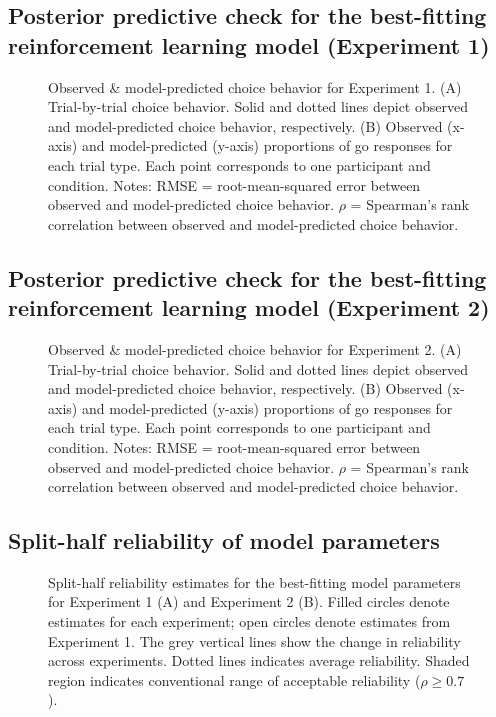 \documentclass[a4paper,12pt]{article}
\begin{document}
\begin{refsection}[supp]
\break
\subsection*{Posterior predictive check for the best-fitting reinforcement learning model (Experiment 1)}

\begin{figure}[h]
    \centerline{}
    \caption{Observed \& model-predicted choice behavior for Experiment 1. (A) Trial-by-trial choice behavior. Solid and dotted lines depict observed and model-predicted choice behavior, respectively. (B) Observed (x-axis) and model-predicted (y-axis) proportions of go responses for each trial type. Each point corresponds to one participant and condition. Notes: RMSE = root-mean-squared error between observed and model-predicted choice behavior. $\rho$ = Spearman's rank correlation between observed and model-predicted choice behavior.}
    \label{fig:exp1_ppc}
\end{figure}

\clearpage
\subsection*{Posterior predictive check for the best-fitting reinforcement learning model (Experiment 2)}

\begin{figure}[h]
    \centerline{}
     \caption{Observed \& model-predicted choice behavior for Experiment 2. (A) Trial-by-trial choice behavior. Solid and dotted lines depict observed and model-predicted choice behavior, respectively. (B) Observed (x-axis) and model-predicted (y-axis) proportions of go responses for each trial type. Each point corresponds to one participant and condition. Notes: RMSE = root-mean-squared error between observed and model-predicted choice behavior. $\rho$ = Spearman's rank correlation between observed and model-predicted choice behavior.}
    \label{fig:exp2_ppc}
\end{figure}

\clearpage
\subsection*{Split-half reliability of model parameters}

\begin{figure}[h]
    \centerline{}
    \caption{Split-half reliability estimates for the best-fitting model parameters for Experiment 1 (A) and Experiment 2 (B). Filled circles denote estimates for each experiment; open circles denote estimates from Experiment 1. The grey vertical lines show the change in reliability across experiments. Dotted lines indicates average reliability. Shaded region indicates conventional range of acceptable reliability ($\rho \geq 0.7$).}
    \label{fig:figS04}
\end{figure}


\end{refsection}
\end{document}
